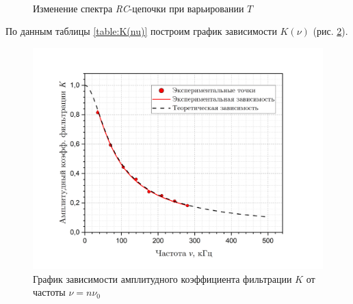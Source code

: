 \documentclass[a4paper, 12pt]{article}
\begin{document}
    \begin{figure}[H]
        \centering
         \\
        \caption{Изменение спектра \textit{RC}-цепочки при варьировании $T$}
        \label{spectrum_D}
    \end{figure}

     По данным таблицы \ref{table:K(nu)} построим график зависимости $K(\nu)$ (рис. \ref{graph:K(nu)}).

    \begin{figure}[H]
        \centering
        \includegraphics[width = 14 cm]{images/graph_K(nu).png}
        \caption{График зависимости амплитудного коэффициента фильтрации $K$ от частоты $\nu = n \nu_0$}
        \label{graph:K(nu)}
    \end{figure}
\end{document}
